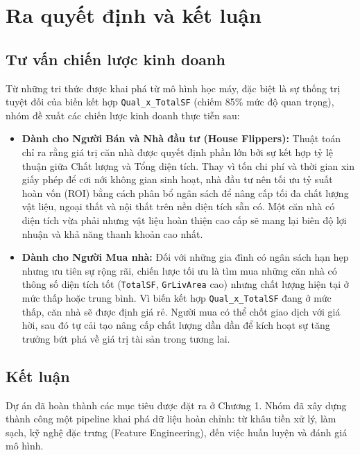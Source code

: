 \clearpage
\section{Ra quyết định và kết luận}

\subsection{Tư vấn chiến lược kinh doanh}
Từ những tri thức được khai phá từ mô hình học máy, đặc biệt là sự thống trị tuyệt đối của biến kết hợp \texttt{Qual\_x\_TotalSF} (chiếm 85\% mức độ quan trọng), nhóm đề xuất các chiến lược kinh doanh thực tiễn sau:

\begin{itemize}
    \item[-] \textbf{Dành cho Người Bán và Nhà đầu tư (House Flippers):} Thuật toán chỉ ra rằng giá trị căn nhà được quyết định phần lớn bởi sự kết hợp tỷ lệ thuận giữa Chất lượng và Tổng diện tích. Thay vì tốn chi phí và thời gian xin giấy phép để cơi nới không gian sinh hoạt, nhà đầu tư nên tối ưu tỷ suất hoàn vốn (ROI) bằng cách phân bổ ngân sách để nâng cấp tối đa chất lượng vật liệu, ngoại thất và nội thất trên nền diện tích sẵn có. Một căn nhà có diện tích vừa phải nhưng vật liệu hoàn thiện cao cấp sẽ mang lại biên độ lợi nhuận và khả năng thanh khoản cao nhất.
    
    \item[-] \textbf{Dành cho Người Mua nhà:} Đối với những gia đình có ngân sách hạn hẹp nhưng ưu tiên sự rộng rãi, chiến lược tối ưu là tìm mua những căn nhà có thông số diện tích tốt (\texttt{TotalSF}, \texttt{GrLivArea} cao) nhưng chất lượng hiện tại ở mức thấp hoặc trung bình. Vì biến kết hợp \texttt{Qual\_x\_TotalSF} đang ở mức thấp, căn nhà sẽ được định giá rẻ. Người mua có thể chốt giao dịch với giá hời, sau đó tự cải tạo nâng cấp chất lượng dần dần để kích hoạt sự tăng trưởng bứt phá về giá trị tài sản trong tương lai.
\end{itemize}

\subsection{Kết luận}
Dự án đã hoàn thành các mục tiêu được đặt ra ở Chương 1. Nhóm đã xây dựng thành công một pipeline khai phá dữ liệu hoàn chỉnh: từ khâu tiền xử lý, làm sạch, kỹ nghệ đặc trưng (Feature Engineering), đến việc huấn luyện và đánh giá mô hình.\medskip

